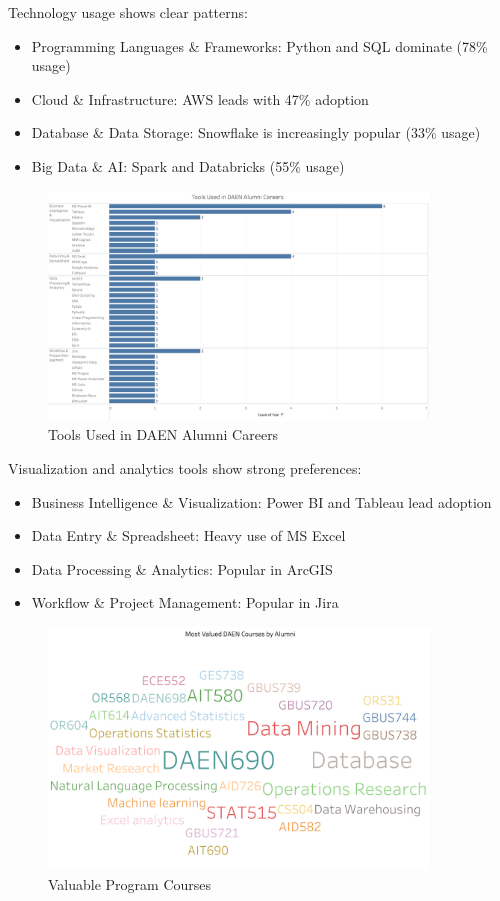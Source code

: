 \documentclass[12pt,a4paper]{article}
\begin{document}
Technology usage shows clear patterns:
\begin{itemize}
\item Programming Languages \& Frameworks: Python and SQL dominate (78\% usage)
\item Cloud \& Infrastructure: AWS leads with 47\% adoption
\item Database \& Data Storage: Snowflake is increasingly popular (33\% usage)
\item Big Data \& AI: Spark and Databricks (55\% usage)
\end{itemize}

\begin{figure}[H]
    \centering
    \includegraphics[width=0.9\textwidth]{visualizations/career-tools.png}
    \caption{Tools Used in DAEN Alumni Careers}
    \label{fig:career-tools}
\end{figure}

Visualization and analytics tools show strong preferences:
\begin{itemize}
\item Business Intelligence \& Visualization: Power BI and Tableau lead adoption
\item Data Entry \& Spreadsheet: Heavy use of MS Excel
\item Data Processing \& Analytics: Popular in ArcGIS
\item Workflow \& Project Management: Popular in Jira
\end{itemize}
\begin{figure}[H]
    \centering
    \includegraphics[width=0.9\textwidth]{visualizations/daen-courses.png}
    \caption{Valuable Program Courses}
    \label{fig:daen-courses}
\end{figure}
\end{document}
